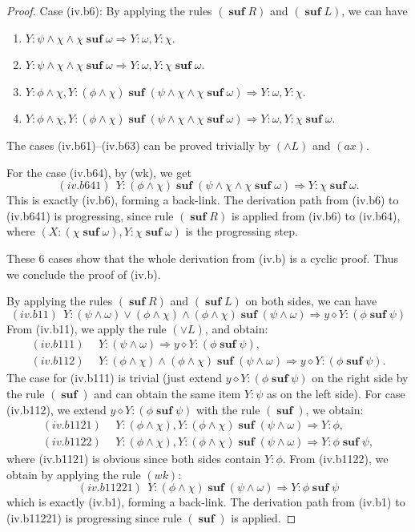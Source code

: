 \documentclass[manuscript,screen]{acmart}
\newcommand{\cat}[0]{\diamond}
\DeclareMathOperator{\osuf}{\mathbf{suf}}
\begin{document}
\begin{proof}
Case (iv.b6): By applying the rules $(\osuf R)$ and $(\osuf L)$, we can have
\begin{enumerate}
\item[(iv.b61)] $Y : \psi\wedge \chi\wedge \chi\osuf\omega\Rightarrow Y : \omega, Y : \chi$. 
\item[(iv.b62)] $Y : \psi\wedge \chi\wedge \chi\osuf\omega\Rightarrow Y : \omega, Y : \chi\osuf\omega$. 
\item[(iv.b63)] $Y : \phi\wedge \chi, Y : (\phi\wedge\chi)\osuf(\psi\wedge\chi\wedge\chi\osuf\omega)\Rightarrow Y : \omega, Y : \chi$. 
\item[(iv.b64)] $Y : \phi\wedge \chi, Y : (\phi\wedge\chi)\osuf(\psi\wedge\chi\wedge\chi\osuf\omega)\Rightarrow Y : \omega, Y : \chi\osuf\omega$. 
\end{enumerate}
The cases (iv.b61)--(iv.b63) can be proved trivially by $(\wedge L)$ and $(ax)$. 

For the case (iv.b64), by (wk), we get
$$
(iv.b641)\ \ Y : (\phi\wedge\chi)\osuf (\psi\wedge \chi\wedge \chi\osuf\omega) \Rightarrow Y : \chi\osuf \omega. 
$$
This is exactly (iv.b6), forming a back-link.
The derivation path from (iv.b6) to (iv.b641) is progressing, since rule $(\osuf R)$ is applied from (iv.b6) to (iv.b64), where $(X : (\chi\osuf \omega), Y : \chi\osuf\omega)$ is the progressing step. 

These 6 cases show that the whole derivation from (iv.b) is a cyclic proof. 
Thus we conclude the proof of (iv.b). 

\ifx
By applying the rules $(\osuf R)$ and $(\osuf L)$ on both sides, we can have 
$$
(iv.b11)\ \  Y : (\psi\wedge \omega) \vee (\phi\wedge\chi)\wedge (\phi\wedge\chi)\osuf (\psi\wedge \omega)\Rightarrow y\cat Y : (\phi\osuf \psi)
$$
From (iv.b11), we apply the rule $(\vee L)$, and obtain:
$$
\begin{aligned}
(iv.b111)\ \ & Y : (\psi\wedge \omega) \Rightarrow y\cat Y : (\phi\osuf \psi), \\
(iv.b112)\ \ & Y : (\phi\wedge\chi)\wedge (\phi\wedge\chi)\osuf (\psi\wedge \omega) \Rightarrow y\cat Y : (\phi\osuf \psi).
\end{aligned}
$$
The case for (iv.b111) is trivial (just extend $y\cat Y : (\phi\osuf \psi)$ on the right side by the rule $(\osuf)$ and can obtain the same item $Y : \psi$ as on the left side). 
For case (iv.b112), we extend $y\cat Y : (\phi\osuf\psi)$ with the rule $(\osuf)$, we obtain:
$$
\begin{aligned}
(iv.b1121)\ \ & Y : (\phi\wedge\chi), Y : (\phi\wedge\chi)\osuf (\psi\wedge \omega) \Rightarrow Y : \phi,\\
(iv.b1122)\ \ & Y : (\phi\wedge\chi), Y : (\phi\wedge\chi)\osuf (\psi\wedge \omega) \Rightarrow Y : \phi\osuf \psi, 
\end{aligned}
$$
where (iv.b1121) is obvious since both sides contain $Y:\phi$. 
From (iv.b1122), we obtain by applying the rule $(wk)$:
$$
(iv.b11221)\ \ Y : (\phi\wedge\chi)\osuf (\psi\wedge \omega) \Rightarrow Y : \phi\osuf \psi
$$
which is exactly (iv.b1), forming a back-link.  
The derivation path from (iv.b1) to (iv.b11221) is progressing since rule $(\osuf)$ is applied.  
\fi


\end{proof}
\end{document}
